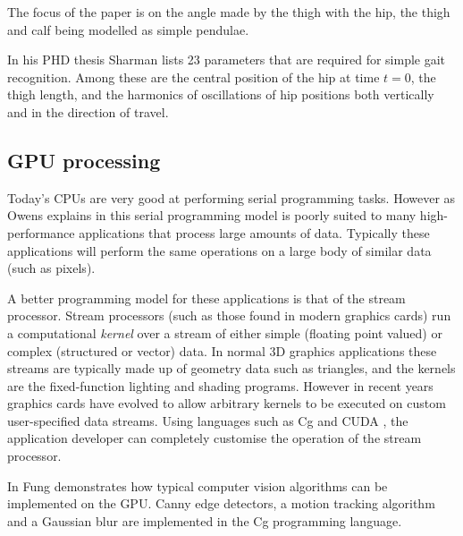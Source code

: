The focus of the paper is on the angle made by the thigh with the hip, the thigh and calf being modelled as simple pendulae.

\bigskip
\noindent In his PHD thesis \cite{KarlSharman} Sharman lists 23 parameters that are required for simple gait recognition.
Among these are the central position of the hip at time $t = 0$, the thigh length, and the harmonics of oscillations of hip positions both vertically and in the direction of travel.


\subsection{GPU processing}

Today's CPUs are very good at performing serial programming tasks.
However as Owens explains in \cite{GemsStreams} this serial programming model is poorly suited to many high-performance applications that process large amounts of data.
Typically these applications will perform the same operations on a large body of similar data (such as pixels).

A better programming model for these applications is that of the stream processor.
Stream processors (such as those found in modern graphics cards) run a computational \emph{kernel} over a stream of either simple (floating point valued) or complex (structured or vector) data.
In normal 3D graphics applications these streams are typically made up of geometry data such as triangles, and the kernels are the fixed-function lighting and shading programs.
However in recent years graphics cards have evolved to allow arbitrary kernels to be executed on custom user-specified data streams.
Using languages such as Cg \cite{CgToolkit} and CUDA \cite{CudaToolkit}, the application developer can completely customise the operation of the stream processor.

\bigskip
\noindent In \cite{GemsVision} Fung demonstrates how typical computer vision algorithms can be implemented on the GPU.
Canny edge detectors, a motion tracking algorithm and a Gaussian blur are implemented in the Cg programming language.